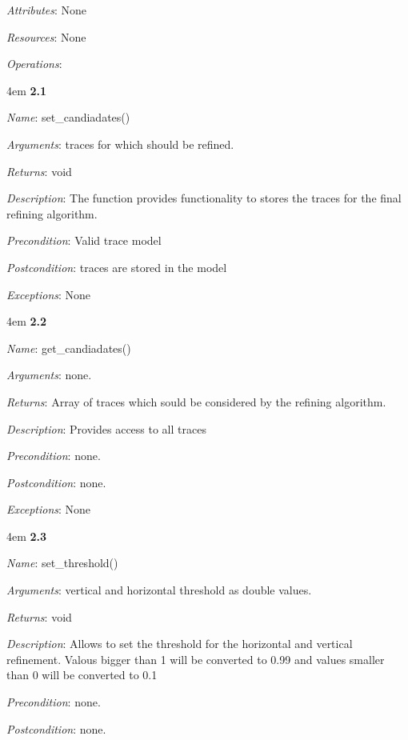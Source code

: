 \documentclass[notitlepage]{article}
\begin{document}
\begin{flushleft}
\textit{Attributes}: None

\textit{Resources}: None

\textit{Operations}: 
\medskip


\par
\begingroup
\leftskip4em
\textbf{2.1} 

\textit{Name}: set\_candiadates()

\textit{Arguments}: traces for which should be refined.

\textit{Returns}: void

\textit{Description}: The function provides functionality to stores the traces for the final refining algorithm. 

\textit{Precondition}: Valid trace model

\textit{Postcondition}: traces are stored in the model

\textit{Exceptions}: None

\par
\endgroup

\medskip


\par
\begingroup
\leftskip4em
\textbf{2.2} 

\textit{Name}: get\_candiadates()

\textit{Arguments}: none.

\textit{Returns}: Array of traces which sould be considered by the refining algorithm.

\textit{Description}: Provides access to all traces 

\textit{Precondition}: none.

\textit{Postcondition}: none.

\textit{Exceptions}: None
\par
\endgroup

\par
\begingroup
\leftskip4em
\textbf{2.3} 

\textit{Name}: set\_threshold()

\textit{Arguments}: vertical and horizontal threshold as double values.

\textit{Returns}: void

\textit{Description}: Allows to set the threshold for the horizontal and vertical refinement. Valous bigger than 1 will be converted to 0.99 and values smaller than 0 will be converted to 0.1

\textit{Precondition}: none.

\textit{Postcondition}: none.


\end{flushleft}
\end{document}
